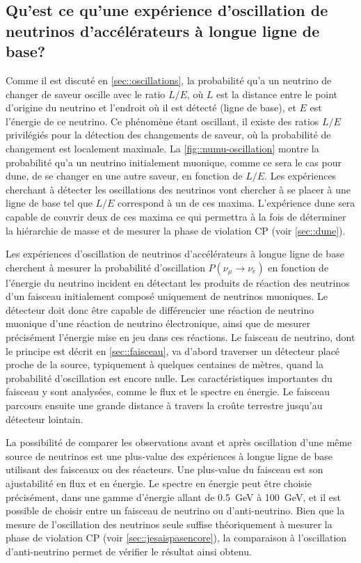         \subsection{Qu'est ce qu'une expérience d'oscillation de neutrinos d'accélérateurs à longue ligne de base?}
            
            Comme il est discuté en \autoref{sec::oscillations}, la probabilité qu'a un neutrino de changer de saveur oscille avec le ratio $L/E$, où $L$ est la distance entre le point d'origine du neutrino et l'endroit où il est détecté (ligne de base), et $E$ est l'énergie de ce neutrino. Ce phénomène étant oscillant, il existe des ratios $L/E$ privilégiés pour la détection des changements de saveur, où la probabilité de changement est localement maximale. La \autoref{fig::numu-oscillation} montre la probabilité qu'a un neutrino initialement muonique, comme ce sera le cas pour \gls{dune}, de se changer en une autre saveur, en fonction de $L/E$. Les expériences cherchant à détecter les oscillations des neutrinos vont chercher à se placer à une ligne de base tel que $L/E$ correspond à un de ces maxima. L'expérience \gls{dune} sera capable de couvrir deux de ces maxima ce qui permettra à la fois de déterminer la hiérarchie de masse et de mesurer la phase de violation CP (voir \autoref{sec::dune}). 
            
            Les expériences d'oscillation de neutrinos d'accélérateurs à longue ligne de base cherchent à mesurer la probabilité d'oscillation $P(\nu_{\mu}\to \nu_e)$ en fonction de l'énergie du neutrino incident en détectant les produits de réaction des neutrinos d'un faisceau initialement composé uniquement de neutrinos muoniques. Le détecteur doit donc être capable de différencier une réaction de neutrino muonique d'une réaction de neutrino électronique, ainsi que de mesurer précisément l'énergie mise en jeu dans ces réactions. Le faisceau de neutrino, dont le principe est décrit en \autoref{sec::faisceau}, va d'abord traverser un détecteur placé proche de la source, typiquement à quelques centaines de mètres, quand la probabilité d'oscillation est encore nulle. Les caractéristiques importantes du faisceau y sont analysées, comme le flux et le spectre en énergie. Le faisceau parcours ensuite une grande distance à travers la croûte terrestre jusqu'au détecteur lointain. 
            
            La possibilité de comparer les observations avant et après oscillation d'une même source de neutrinos est une plus-value des expériences à longue ligne de base utilisant des faisceaux ou des réacteurs. Une plus-value du faisceau est son ajustabilité en flux et en énergie. Le spectre en énergie peut être choisie précisément, dans une gamme d'énergie allant de \SI{0.5}{\giga\electronvolt} à \SI{100}{\giga\electronvolt}, et il est possible de choisir entre un faisceau de neutrino ou d'anti-neutrino. Bien que la mesure de l'oscillation des neutrinos seule suffise théoriquement à mesurer la phase de violation CP (voir \autoref{sec::jesaispasencore}), la comparaison à l'oscillation d'anti-neutrino permet de vérifier le résultat ainsi obtenu.
            
